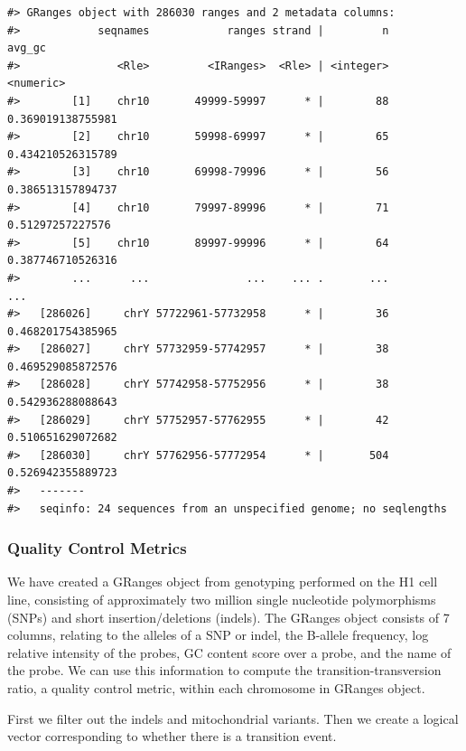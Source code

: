 \documentclass[]{article}
\begin{document}
\begin{verbatim}
#> GRanges object with 286030 ranges and 2 metadata columns:
#>            seqnames            ranges strand |         n            avg_gc
#>               <Rle>         <IRanges>  <Rle> | <integer>         <numeric>
#>        [1]    chr10       49999-59997      * |        88 0.369019138755981
#>        [2]    chr10       59998-69997      * |        65 0.434210526315789
#>        [3]    chr10       69998-79996      * |        56 0.386513157894737
#>        [4]    chr10       79997-89996      * |        71  0.51297257227576
#>        [5]    chr10       89997-99996      * |        64 0.387746710526316
#>        ...      ...               ...    ... .       ...               ...
#>   [286026]     chrY 57722961-57732958      * |        36 0.468201754385965
#>   [286027]     chrY 57732959-57742957      * |        38 0.469529085872576
#>   [286028]     chrY 57742958-57752956      * |        38 0.542936288088643
#>   [286029]     chrY 57752957-57762955      * |        42 0.510651629072682
#>   [286030]     chrY 57762956-57772954      * |       504 0.526942355889723
#>   -------
#>   seqinfo: 24 sequences from an unspecified genome; no seqlengths
\end{verbatim}

\subsubsection{Quality Control Metrics}\label{quality-control-metrics}

We have created a GRanges object from genotyping performed on the H1
cell line, consisting of approximately two million single nucleotide
polymorphisms (SNPs) and short insertion/deletions (indels). The GRanges
object consists of 7 columns, relating to the alleles of a SNP or indel,
the B-allele frequency, log relative intensity of the probes, GC content
score over a probe, and the name of the probe. We can use this
information to compute the transition-transversion ratio, a quality
control metric, within each chromosome in GRanges object.

First we filter out the indels and mitochondrial variants. Then we
create a logical vector corresponding to whether there is a transition
event.
\end{document}
